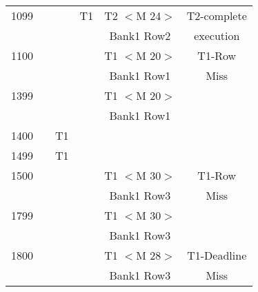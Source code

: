 \begin{table}[t]
{\begin{tabular}{|c|c|c|c|c|c|}
    1099&          &              & T1        &T2 $<$M 24$>$& T2-complete \\ 
        &          &              &           &Bank1 Row2& execution\\ \hline
    1100&          &              &           &T1 $<$M 20$>$& T1-Row \\ 
        &          &              &           &Bank1 Row1& Miss\\ \hline
    1399&          &              &           &T1 $<$M 20$>$&\\
        &          &              &           &Bank1 Row1&\\ \hline
    1400&          & T1           &           &          &\\ \hline
    1499&          & T1           &           &          &\\ \hline
    1500&          &              &           &T1 $<$M 30$>$& T1-Row\\ 
        &          &              &           &Bank1 Row3& Miss\\ \hline
    1799&          &              &           &T1 $<$M 30$>$& \\
        &          &              &           &Bank1 Row3&\\ \hline
    1800&          &              &           &T1 $<$M 28$>$& T1-Deadline \\ 
        &          &              &           &Bank1 Row3& Miss\\ \hline     
\end{tabular}
}

\label{tab2}
\end{table}

